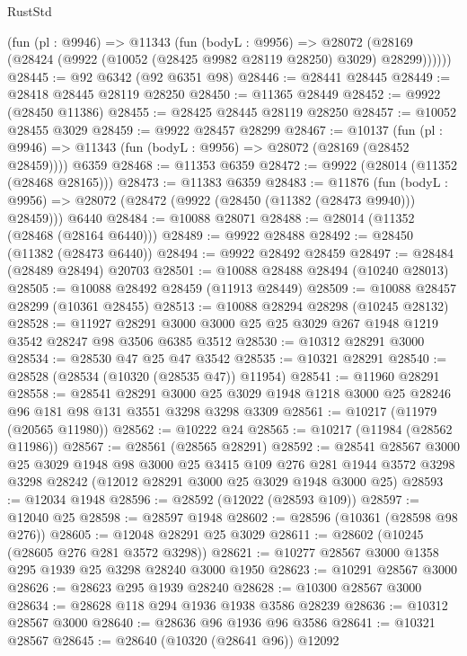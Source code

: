 \begin{lexlean}{RustStd}
\begin{coremodule}
      (fun (pl : @9946) =>
      @11343
        (fun (bodyL : @9956) =>
        @28072 (@28169 (@28424 (@9922 (@10052 (@28425 @9982 @28119 @28250) @3029) @28299))))))
@28445 := @92 @6342 (@92 @6351 @98)
@28446 := @28441 @28445
@28449 := @28418 @28445 @28119 @28250
@28450 := @11365 @28449
@28452 := @9922 (@28450 @11386)
@28455 := @28425 @28445 @28119 @28250
@28457 := @10052 @28455 @3029
@28459 := @9922 @28457 @28299
@28467 := @10137
    (fun (pl : @9946) => @11343 (fun (bodyL : @9956) => @28072 (@28169 (@28452 @28459))))
    @6359
@28468 := @11353 @6359
@28472 := @9922 (@28014 (@11352 (@28468 @28165)))
@28473 := @11383 @6359
@28483 := @11876
    (fun (bodyL : @9956) => @28072 (@28472 (@9922 (@28450 (@11382 (@28473 @9940))) @28459)))
    @6440
@28484 := @10088 @28071
@28488 := @28014 (@11352 (@28468 (@28164 @6440)))
@28489 := @9922 @28488
@28492 := @28450 (@11382 (@28473 @6440))
@28494 := @9922 @28492 @28459
@28497 := @28484 (@28489 @28494) @20703
@28501 := @10088 @28488 @28494 (@10240 @28013)
@28505 := @10088 @28492 @28459 (@11913 @28449)
@28509 := @10088 @28457 @28299 (@10361 @28455)
@28513 := @10088 @28294 @28298 (@10245 @28132)
@28528 := @11927
    @28291
    @3000
    @3000
    @25
    @25
    @3029
    @267
    @1948
    @1219
    @3542
    @28247
    @98
    @3506
    @6385
    @3512
@28530 := @10312 @28291 @3000
@28534 := @28530 @47 @25 @47 @3542
@28535 := @10321 @28291
@28540 := @28528 (@28534 (@10320 (@28535 @47)) @11954)
@28541 := @11960 @28291
@28558 := @28541
    @28291
    @3000
    @25
    @3029
    @1948
    @1218
    @3000
    @25
    @28246
    @96
    @181
    @98
    @131
    @3551
    @3298
    @3298
    @3309
@28561 := @10217 (@11979 (@20565 @11980))
@28562 := @10222 @24
@28565 := @10217 (@11984 (@28562 @11986))
@28567 := @28561 (@28565 @28291)
@28592 := @28541
    @28567
    @3000
    @25
    @3029
    @1948
    @98
    @3000
    @25
    @3415
    @109
    @276
    @281
    @1944
    @3572
    @3298
    @3298
    @28242
    (@12012 @28291 @3000 @25 @3029 @1948 @3000 @25)
@28593 := @12034 @1948
@28596 := @28592 (@12022 (@28593 @109))
@28597 := @12040 @25
@28598 := @28597 @1948
@28602 := @28596 (@10361 (@28598 @98 @276))
@28605 := @12048 @28291 @25 @3029
@28611 := @28602 (@10245 (@28605 @276 @281 @3572 @3298))
@28621 := @10277 @28567 @3000 @1358 @295 @1939 @25 @3298 @28240 @3000 @1950
@28623 := @10291 @28567 @3000
@28626 := @28623 @295 @1939 @28240
@28628 := @10300 @28567 @3000
@28634 := @28628 @118 @294 @1936 @1938 @3586 @28239
@28636 := @10312 @28567 @3000
@28640 := @28636 @96 @1936 @96 @3586
@28641 := @10321 @28567
@28645 := @28640 (@10320 (@28641 @96)) @12092

\end{coremodule}
\end{lexlean}
